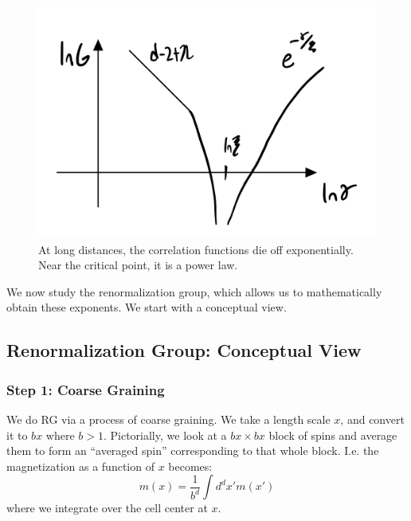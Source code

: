 \begin{figure}[htbp]
    \centering
    \includegraphics[scale=0.5]{Lectures/Figures/correlation_scaling.png}
    \caption{At long distances, the correlation functions die off exponentially. Near the critical point, it is a power law.}
    \label{fig:correlation_scaling}
\end{figure}

We now study the renormalization group, which allows us to mathematically obtain these exponents. We start with a conceptual view.

\subsection{Renormalization Group: Conceptual View}
\subsubsection*{Step 1: Coarse Graining}
We do RG via a process of coarse graining. We take a length scale $x$, and convert it to $bx$ where $b > 1$. Pictorially, we look at a $bx \times bx$ block of spins and average them to form an ``averaged spin'' corresponding to that whole block. I.e. the magnetization as a function of $x$ becomes:
\begin{equation}
    m(x) = \frac{1}{b^d}\int d^dx' m(x')
\end{equation}
where we integrate over the cell center at $x$.

